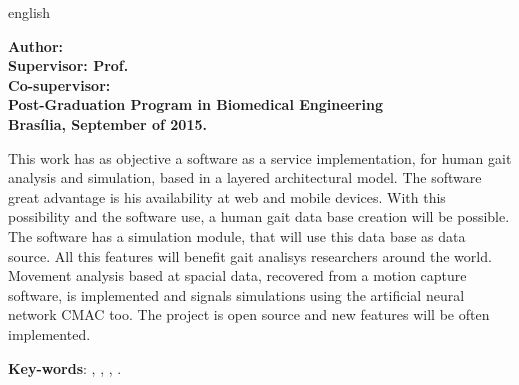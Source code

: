 \begin{resumo}[Abstract]
 \begin{otherlanguage*}{english}

 \begin{center}
\textbf{\imprimirTitle}
\end{center}

\begin{flushleft}
\footnotesize
\textbf{Author: \imprimirautor}\\
\textbf{Supervisor: Prof. \imprimirorientador} \\
\textbf{Co-supervisor: \imprimirmembroCoorientador} \\
\textbf{Post-Graduation Program in Biomedical Engineering} \\
\textbf{Brasília, September of 2015.}\newline
\end{flushleft}
 
This work has as objective a software as a service implementation, for human gait analysis and simulation, based in a layered architectural model. 
The software great advantage is his availability at web and mobile devices. 
With this possibility and the software use, a human gait data base creation will be possible.
The software has a simulation module, that will use this data base as data source.
All this features will benefit gait analisys researchers around the world.
Movement analysis based at spacial data, recovered from a motion capture software, is implemented and signals simulations using the artificial neural network CMAC too.
The project is open source and new features will be often implemented.

   \vspace{\onelineskip}
 
   \noindent 
   \textbf{Key-words}: 	\imprimirpalavrachaveumingles, \imprimirpalavrachavedoisingles, 
			\imprimirpalavrachavetresingles, \imprimirpalavrachavequatroingles.

 \end{otherlanguage*}
\end{resumo}
